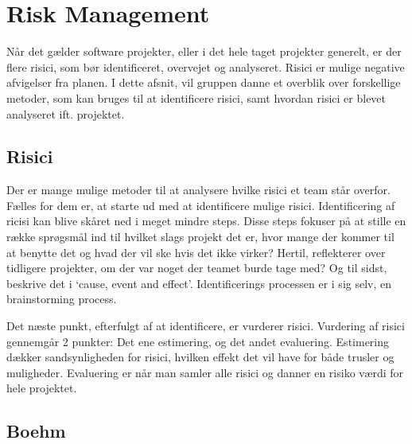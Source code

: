 \chapter{Risk Management}\label{ch:Risk Management}

Når det gælder software projekter, eller i det hele taget projekter generelt, er der flere risici, som bør identificeret, overvejet og analyseret. Risici er mulige negative afvigelser fra planen.\cite{SlideRiskAnalysis} I dette afsnit, vil gruppen danne et overblik over forskellige metoder, som kan bruges til at identificere risici, samt hvordan risici er blevet analyseret ift. projektet.

\section{Risici}

Der er mange mulige metoder til at analysere hvilke risici et team står overfor. Fælles for dem er, at starte ud med at identificere mulige risici.
Identificering af ricisi kan blive skåret ned i meget mindre steps. \cite{SlideRiskAnalysis} Disse steps fokuser på at stille en række sprøgsmål ind til hvilket slags projekt det er, hvor mange der kommer til at benytte det og hvad der vil ske hvis det ikke virker? Hertil, reflekterer over tidligere projekter, om der var noget der teamet burde tage med? Og til sidst, beskrive det i ‘cause, event and effect’. Identificerings processen er i sig selv, en brainstorming process.

Det næste punkt, efterfulgt af at identificere, er vurderer risici. Vurdering af risici gennemgår 2 punkter: Det ene estimering, og det andet evaluering. Estimering dækker sandsynligheden for risici, hvilken effekt det vil have for både trusler og muligheder. Evaluering er når man samler alle risici og danner en risiko værdi for hele projektet.


\section{Boehm}

